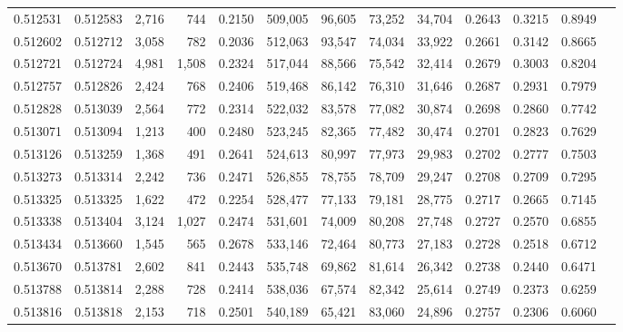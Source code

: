 \begin{tabular}{rrrrrrrrrrrrr}
0.512531 & 0.512583 & 2,716 &   744 &                                     0.2150 & 509,005 &  96,605 &  73,252 &  34,704 & 0.2643 & 0.3215 & 0.8949 \\
0.512602 & 0.512712 & 3,058 &   782 &                                     0.2036 & 512,063 &  93,547 &  74,034 &  33,922 & 0.2661 & 0.3142 & 0.8665 \\
0.512721 & 0.512724 & 4,981 & 1,508 &                                     0.2324 & 517,044 &  88,566 &  75,542 &  32,414 & 0.2679 & 0.3003 & 0.8204 \\
0.512757 & 0.512826 & 2,424 &   768 &                                     0.2406 & 519,468 &  86,142 &  76,310 &  31,646 & 0.2687 & 0.2931 & 0.7979 \\
0.512828 & 0.513039 & 2,564 &   772 &                                     0.2314 & 522,032 &  83,578 &  77,082 &  30,874 & 0.2698 & 0.2860 & 0.7742 \\
0.513071 & 0.513094 & 1,213 &   400 &                                     0.2480 & 523,245 &  82,365 &  77,482 &  30,474 & 0.2701 & 0.2823 & 0.7629 \\
0.513126 & 0.513259 & 1,368 &   491 &                                     0.2641 & 524,613 &  80,997 &  77,973 &  29,983 & 0.2702 & 0.2777 & 0.7503 \\
0.513273 & 0.513314 & 2,242 &   736 &                                     0.2471 & 526,855 &  78,755 &  78,709 &  29,247 & 0.2708 & 0.2709 & 0.7295 \\
0.513325 & 0.513325 & 1,622 &   472 &                                     0.2254 & 528,477 &  77,133 &  79,181 &  28,775 & 0.2717 & 0.2665 & 0.7145 \\
0.513338 & 0.513404 & 3,124 & 1,027 &                                     0.2474 & 531,601 &  74,009 &  80,208 &  27,748 & 0.2727 & 0.2570 & 0.6855 \\
0.513434 & 0.513660 & 1,545 &   565 &                                     0.2678 & 533,146 &  72,464 &  80,773 &  27,183 & 0.2728 & 0.2518 & 0.6712 \\
0.513670 & 0.513781 & 2,602 &   841 &                                     0.2443 & 535,748 &  69,862 &  81,614 &  26,342 & 0.2738 & 0.2440 & 0.6471 \\
0.513788 & 0.513814 & 2,288 &   728 &                                     0.2414 & 538,036 &  67,574 &  82,342 &  25,614 & 0.2749 & 0.2373 & 0.6259 \\
0.513816 & 0.513818 & 2,153 &   718 &                                     0.2501 & 540,189 &  65,421 &  83,060 &  24,896 & 0.2757 & 0.2306 & 0.6060 \\

\end{tabular}
